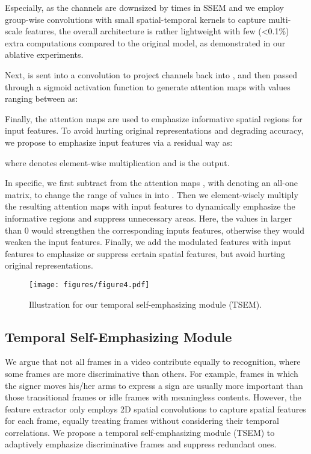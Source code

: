 \documentclass[letterpaper]{article} \usepackage{aaai23}  \usepackage{times}  \usepackage{helvet}  \usepackage{courier}  \usepackage[hyphens]{url}  \usepackage{graphicx} \urlstyle{rm} \def\UrlFont{\rm}  \usepackage{natbib}  \usepackage{caption} \frenchspacing  \setlength{\pdfpagewidth}{8.5in} \setlength{\pdfpageheight}{11in} \usepackage{algorithm}
\begin{document}
Especially, as the channels are downsized by  times in SSEM and we employ group-wise convolutions with small spatial-temporal kernels to capture multi-scale features, the overall architecture is rather lightweight with few (\textless 0.1\%) extra computations compared to the original model, as demonstrated in our ablative experiments.

Next,  is sent into a  convolution to project channels back into , and then passed through a sigmoid activation function to generate attention maps  with values ranging between  as:


Finally, the attention maps  are used to emphasize informative spatial regions for input features. To avoid hurting original representations and degrading accuracy, we propose to emphasize input features via a residual way as:

where  denotes element-wise multiplication and  is the output. 

In specific, we first subtract  from the attention maps , with  denoting an all-one matrix, to change the range of values in  into . Then we element-wisely multiply the resulting attention maps with input features  to dynamically emphasize the informative regions and suppress unnecessary areas. Here, the values in  larger than 0 would strengthen the corresponding inputs features, otherwise they would weaken the input features. Finally, we add the modulated features with input features  to emphasize or suppress certain spatial features, but avoid hurting original representations.

\begin{figure}[t]
  \centering
  \texttt{[image: figures/figure4.pdf]}
  \caption{Illustration for our temporal self-emphasizing module (TSEM).} \label{fig4}
  \end{figure}

\subsection{Temporal Self-Emphasizing Module}
We argue that not all frames in a video contribute equally to recognition, where some frames are more discriminative than others. For example, frames in which the signer moves his/her arms to express a sign are usually more important than those transitional frames or idle frames with meaningless contents. However, the feature extractor only employs 2D spatial convolutions to capture spatial features for each frame, equally treating frames without considering their temporal correlations. We propose a temporal self-emphasizing module (TSEM) to adaptively emphasize discriminative frames and suppress redundant ones. 
\end{document}

